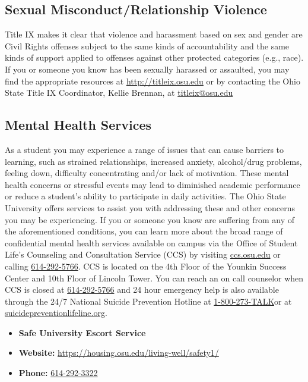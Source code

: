 \subsection{Sexual Misconduct/Relationship Violence}

Title IX makes it clear that violence and harassment based on sex and gender are Civil Rights offenses subject to the same kinds of accountability and the same kinds of support applied to offenses against other protected categories (e.g., race). If you or someone you know has been sexually harassed or assaulted, you may find the appropriate resources at \href{http://titleix.osu.edu/}{http://titleix.osu.edu} or by contacting the Ohio State Title IX Coordinator, Kellie Brennan, at \href{mailto:titleix@osu.edu}{titleix@osu.edu}

\subsection{Mental Health Services}

As a student you may experience a range of issues that can cause barriers to learning, such as strained relationships, increased anxiety, alcohol/drug problems, feeling down, difficulty concentrating and/or lack of motivation. These mental health concerns or stressful events may lead to diminished academic performance or reduce a student's ability to participate in daily activities. The Ohio State University offers services to assist you with addressing these and other concerns you may be experiencing. If you or someone you know are suffering from any of the aforementioned conditions, you can learn more about the broad range of confidential mental health services available on campus via the Office of Student Life's Counseling and Consultation Service (CCS) by visiting \href{http://ccs.osu.edu/}{ccs.osu.edu} or calling \href{tel:614­2925766}{614­-292-­5766}. CCS is located on the 4th Floor of the Younkin Success Center and 10th Floor of Lincoln Tower. You can reach an on call counselor when CCS is closed at \href{tel:614­292-5766}{614­-292-­5766} and 24 hour emergency help is also available through the 24/7 National Suicide Prevention Hotline at \href{tel:­800­2738255}{1-­800­-273-TALK}or at \href{http://suicidepreventionlifeline.org/}{suicidepreventionlifeline.org}.


\begin{itemize}
      \tightlist
      \item \textbf{Safe University Escort Service}
      \item \textbf{Website:} \href{https://housing.osu.edu/living-well/safety1/}{{https://housing.osu.edu/living-well/safety1/}}
      \item \textbf{Phone:} \href{tel:6142923322}{614-292-3322}
\end{itemize}

